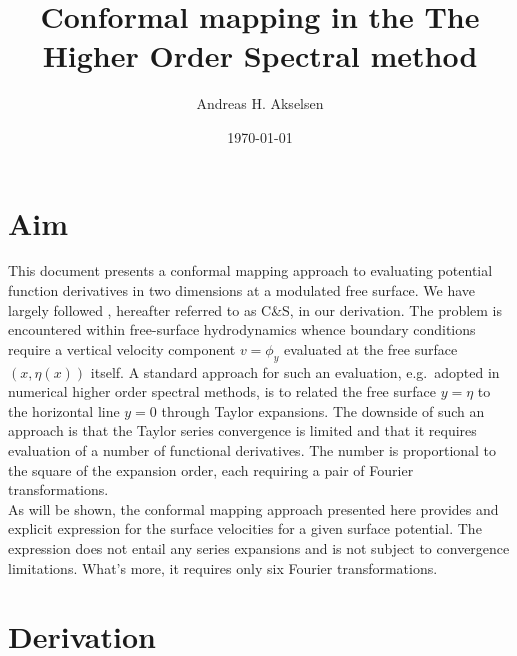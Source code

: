 \documentclass[a4paper,12pt]{article}
\renewcommand{\_}[1]{_\mr{#1}}
\newcommand{\refCS}{C\&S}
\newcommand{\x}{x}
\newcommand{\y}{y}
\newcommand{\surf}{\eta}
\begin{document}
\title{Conformal mapping in the The Higher Order Spectral method}
\author{Andreas H. Akselsen}
\date{\today}
\maketitle


\section{Aim}
This document presents a conformal mapping approach to evaluating potential function derivatives in two dimensions at a modulated free surface.
We have largely followed \citet{chalikov2005modeling}, hereafter referred to as \refCS{}, in our derivation. 
The problem is encountered within free-surface hydrodynamics whence boundary conditions require a vertical velocity component $v=\phi_y$ evaluated at the free surface $(\x,\surf(\x))$ itself.
A standard approach for such an evaluation, e.g.\ adopted in numerical higher order spectral methods, is to related the free surface $\y=\surf$ to the horizontal line $\y=0$ through Taylor expansions.
The downside of such an approach is that the Taylor series convergence is limited \citep{west1981deep} and that it requires evaluation of a number of functional derivatives.
The number is proportional to the square of the expansion order, each requiring a pair of Fourier transformations.
\\

As will be shown, the conformal mapping approach presented here provides and explicit expression for the surface velocities for a given surface potential.
The expression does not entail any series expansions and is not subject to convergence limitations.
What's more, it requires only six Fourier transformations.

\section{Derivation}
\end{document}
